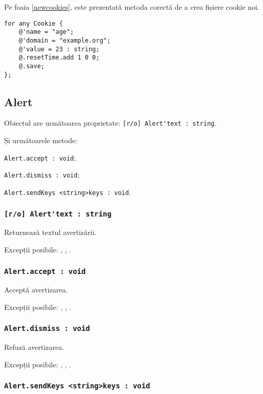 Pe foaia \ref{newcookies}, este prezentată metoda corectă de a crea fișiere cookie noi.

\begin{lstlisting}[caption=Crearea noilor fișiere cookie, label=newcookies]
for any Cookie {
	@'name = "age";
	@'domain = "example.org";
	@'value = 23 : string;
	@.resetTime.add 1 0 0;
	@.save;
};
\end{lstlisting}


\subsection{{\color{orange} Alert}}

Obiectul \alert{} are următoarea proprietate: \lstinline|[r/o] Alert'text : string|.

Și următoarele metode:
\begin{icItems}
	\item \lstinline|Alert.accept : void|;
	\item \lstinline|Alert.dismiss : void|;
	\item \lstinline|Alert.sendKeys <string>keys : void|.
\end{icItems}

\subsubsection{\lstinline|[r/o] Alert'text : string|}

Returnează textul avertizării.

Excepții posibile: , , .

\subsubsection{\lstinline|Alert.accept : void|}

Acceptă avertizarea.

Excepții posibile: , , .

\subsubsection{\lstinline|Alert.dismiss : void|}

Refuză avertizarea.

Excepții posibile: , , .

\subsubsection{\lstinline|Alert.sendKeys <string>keys : void|}

